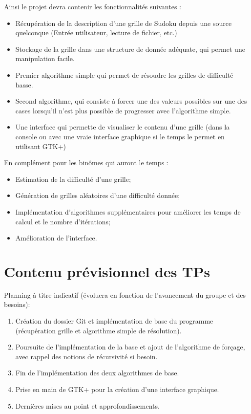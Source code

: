 \documentclass[a4paper,12pt]{article}
\begin{document}
	Ainsi le projet devra contenir les fonctionnalités suivantes : 
	\begin{itemize}
		\item Récupération de la description d'une grille de Sudoku depuis une source quelconque (Entrée utilisateur, lecture de fichier, etc.)
		\item Stockage de la grille dans une structure de donnée adéquate, qui permet une manipulation facile.
		\item Premier algorithme simple qui permet de résoudre les grilles de difficulté basse.
		\item Second algorithme, qui consiste à forcer une des valeurs possibles sur une des cases lorsqu'il n'est plus possible de progresser avec l'algorithme simple.
		\item Une interface qui permette de visualiser le contenu d'une grille (dans la console ou avec une vraie interface graphique si le temps le permet en utilisant GTK+)
	\end{itemize} 

	En complément pour les binômes qui auront le temps : 
	\begin{itemize}
		\item Estimation de la difficulté d'une grille;
		\item Génération de grilles aléatoires d'une difficulté donnée;
		\item Implémentation d'algorithmes supplémentaires pour améliorer les temps de calcul et le nombre d'itérations;
		\item Amélioration de l'interface.
	\end{itemize}
	\section{Contenu prévisionnel des TPs}
	Planning à titre indicatif (évoluera en fonction de l'avancement du groupe et des besoins): 
	\begin{enumerate}
		\item Création du dossier Git et implémentation de base du programme (récupération grille et algorithme simple de résolution).
		\item Poursuite de l'implémentation de la base et ajout de l'algorithme de forçage, avec rappel des notions de récursivité si besoin.
		\item Fin de l'implémentation des deux algorithmes de base.
		\item Prise en main de GTK+ pour la création d'une interface graphique.
		\item Dernières mises au point et approfondissements.
	\end{enumerate}
\end{document}
